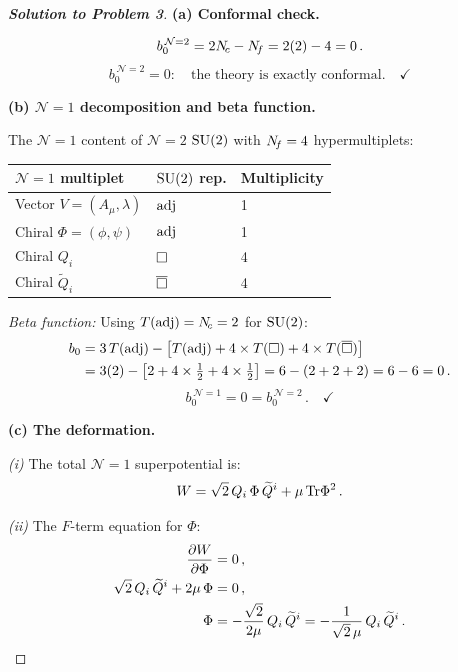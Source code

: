 \documentclass[11pt,a4paper]{article}
\begin{document}
\begin{proof}[\textbf{Solution to Problem 3}]

\textbf{(a) Conformal check.}

\[
  b_0^{\,\mathcal{N}=2} = 2N_{\!c} - N_{\!f} = 2(2) - 4 = 0\,.
\]
\[
  \boxed{b_0^{\,\mathcal{N}=2} = 0:\quad
  \text{the theory is exactly conformal.}}
  \quad\checkmark
\]

\bigskip

\textbf{(b) $\mathcal{N}=1$ decomposition and beta function.}

The $\mathcal{N}=1$ content of $\mathcal{N}=2$ $\mathrm{SU}(2)$ with
$N_{\!f} = 4$ hypermultiplets:

\renewcommand{\arraystretch}{1.3}
\begin{center}
\begin{tabular}{@{}l l l@{}}
\toprule
\textbf{$\mathcal{N}=1$ multiplet} & \textbf{$\mathrm{SU}(2)$ rep.}
  & \textbf{Multiplicity} \\
\midrule
Vector $V = (A_\mu, \lambda)$ & $\mathrm{adj}$ & 1 \\
Chiral $\Phi = (\phi, \psi)$ & $\mathrm{adj}$ & 1 \\
Chiral $Q_i$ & $\square$ & 4 \\
Chiral $\widetilde{Q}_i$ & $\overline{\square}$ & 4 \\
\bottomrule
\end{tabular}
\end{center}

\textit{Beta function:} Using $T(\mathrm{adj}) = N_{\!c} = 2$ for $\mathrm{SU}(2)$:
\begin{align}
  b_0 &= 3\,T(\mathrm{adj}) - \bigl[T(\mathrm{adj})
    + 4 \times T(\square) + 4 \times T(\overline{\square})\bigr]
    \nonumber \\
  &= 3(2) - \bigl[2 + 4 \times \tfrac{1}{2}
    + 4 \times \tfrac{1}{2}\bigr] = 6 - (2 + 2 + 2)
    = 6 - 6 = 0\,.
\end{align}
\[
  \boxed{b_0^{\,\mathcal{N}=1} = 0
  = b_0^{\,\mathcal{N}=2}\,.}
  \quad\checkmark
\]

\bigskip

\textbf{(c) The deformation.}

\textit{(i)} The total $\mathcal{N}=1$ superpotential is:
\begin{equation}\label{eq:W-total-ex}
  W = \sqrt{2}\, Q_i\, \Phi\, \widetilde{Q}^i
  + \mu\,\mathrm{Tr}\Phi^2\,.
\end{equation}

\textit{(ii)} The $F$-term equation for $\Phi$:
\begin{align}
  \frac{\partial W}{\partial\Phi} &= 0\,,
  \nonumber \\
  \sqrt{2}\, Q_i\, \widetilde{Q}^i + 2\mu\,\Phi &= 0\,,
  \nonumber \\
  \Phi &= -\frac{\sqrt{2}}{2\mu}\, Q_i\, \widetilde{Q}^i
  = -\frac{1}{\sqrt{2}\,\mu}\, Q_i\, \widetilde{Q}^i\,.
\end{align}


\end{proof}
\end{document}

